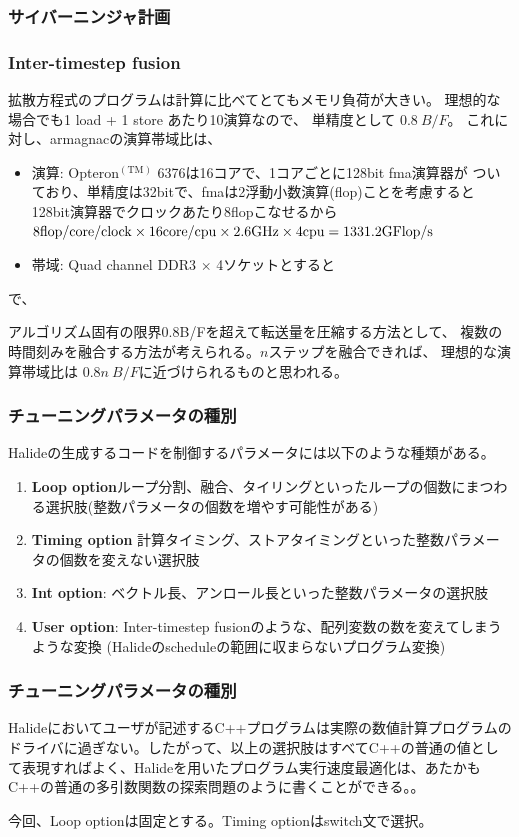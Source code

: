 \documentclass[dvipdfmx,cjk]{beamer}
\begin{document}
\begin{frame}\frametitle{サイバーニンジャ計画}
  
\end{frame}




\begin{frame}\frametitle{Inter-timestep fusion}
  拡散方程式のプログラムは計算に比べてとてもメモリ負荷が大きい。
  理想的な場合でも1 load + 1 store あたり10演算なので、
  単精度として $0.8~B/F$。
  これに対し、armagnacの演算帯域比は、
  \begin{itemize}
  \item 演算: Opteron${}^\mathrm{(TM)}$ 6376は16コアで、1コアごとに128bit fma演算器が
    ついており、単精度は32bitで、fmaは2浮動小数演算(flop)ことを考慮すると128bit演算器でクロックあたり8flopこなせるから $\rm 8flop/core/clock \times 16 core/cpu \times 2.6GHz \times 4cpu = 1331.2GFlop/s$
  \item 帯域: Quad channel DDR3 $\times$ 4ソケットとすると
  \end{itemize}
  
  で、
  
  アルゴリズム固有の限界0.8B/Fを超えて転送量を圧縮する方法として、
  複数の時間刻みを融合する方法が考えられる。$n$ステップを融合できれば、
  理想的な演算帯域比は
   $0.8n~B/F$に近づけられるものと思われる。

\end{frame}


\begin{frame}\frametitle{チューニングパラメータの種別}
  Halideの生成するコードを制御するパラメータには以下のような種類がある。
  \begin{enumerate}
  \item  {\bf Loop option}ループ分割、融合、タイリングといったループの個数にまつわる選択肢(整数パラメータの個数を増やす可能性がある)
  \item  {\bf Timing option} 計算タイミング、ストアタイミングといった整数パラメータの個数を変えない選択肢
  \item  {\bf Int option}: ベクトル長、アンロール長といった整数パラメータの選択肢
  \item  {\bf User option}: Inter-timestep fusionのような、配列変数の数を変えてしまうような変換
    (Halideのscheduleの範囲に収まらないプログラム変換)
  \end{enumerate}
\end{frame}
  
\begin{frame}\frametitle{チューニングパラメータの種別}  
  Halideにおいてユーザが記述するC++プログラムは実際の数値計算プログラムのドライバに過ぎない。したがって、以上の選択肢はすべてC++の普通の値として表現すればよく、Halideを用いたプログラム実行速度最適化は、あたかもC++の普通の多引数関数の探索問題のように書くことができる。。

  今回、Loop optionは固定とする。Timing optionはswitch文で選択。
\end{frame}
\end{document}

